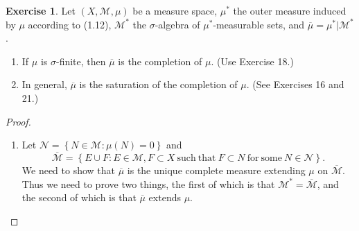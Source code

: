 \documentclass{article}
\theoremstyle{definition}
\newtheorem{ex}{Exercise}
\begin{document}
\begin{ex}
	Let $(X, \mathscr{M}, \mu)$ be a measure space, $\mu^*$ the outer measure induced by $\mu$ according to (1.12), $\mathscr{M}^*$ the $\sigma$-algebra of $\mu^*$-measurable sets, and $\overline{\mu} = \mu^*|\mathscr{M}^*$.
	\begin{enumerate}[label=\textbf{\alph*.}]
		\item If $\mu$ is $\sigma$-finite, then $\overline{\mu}$ is the completion of $\mu$. (Use Exercise 18.)
		\item In general, $\overline{\mu}$ is the saturation of the completion of $\mu$. (See Exercises 16 and 21.)
	\end{enumerate}
\end{ex}
\begin{proof}\
	\begin{enumerate}[label=\textbf{\alph*.}]
		\item Let $\mathscr{N} = \left\lbrace N \in \mathscr{M} : \mu(N) = 0 \right\rbrace$ and \begin{equation*}
			      \overline{\mathscr{M}} = \left\lbrace E \cup F : E \in \mathscr{M}, F \subset X\ \mathrm{such\ that}\ F \subset N\ \mathrm{for\ some}\ N \in \mathscr{N} \right\rbrace.
		      \end{equation*}
		      We need to show that $\overline{\mu}$ is the unique complete measure extending $\mu$ on $\overline{\mathscr{M}}$.
		      Thus we need to prove two things, the first of which is that $\mathscr{M}^* = \overline{\mathscr{M}}$, and the second of which is that $\overline{\mu}$ extends $\mu$.


\end{enumerate}
\end{proof}
\end{document}
